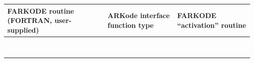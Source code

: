 \documentclass[letterpaper,10pt,english]{sphinxmanual}
\begin{document}
\begin{tabulary}{\linewidth}{|L|L|L|}
\hline
\textbf{\relax 
FARKODE routine
(FORTRAN, user-supplied)
} & \textbf{\relax 
ARKode interface
function type
} & \textbf{\relax 
FARKODE ``activation'' routine
}\\\hline

{\hyperref[f_interface/Usage:f/_/FARKDJAC]{}}
 & 
{\hyperref[c_interface/User_supplied:ARKDlsDenseJacFn]{}}
 & 
{\hyperref[f_interface/Usage:f/_/FARKDENSESETJAC]{}}
\\\hline

{\hyperref[f_interface/Usage:f/_/FARKBJAC]{}}
 & 
{\hyperref[c_interface/User_supplied:ARKDlsBandJacFn]{}}
 & 
{\hyperref[f_interface/Usage:f/_/FARKBANDSETJAC]{}}
\\\hline

{\hyperref[f_interface/Usage:f/_/FARKPSET]{}}
 & 
{\hyperref[c_interface/User_supplied:ARKSpilsPrecSetupFn]{}}
 & 
{\hyperref[f_interface/Usage:f/_/FARKSPILSSETPREC]{}}
\\\hline

{\hyperref[f_interface/Usage:f/_/FARKPSOL]{}}
 & 
{\hyperref[c_interface/User_supplied:ARKSpilsPrecSolveFn]{}}
 & 
{\hyperref[f_interface/Usage:f/_/FARKSPILSSETPREC]{}}
\\\hline

{\hyperref[f_interface/Usage:f/_/FARKJTIMES]{}}
 & 
{\hyperref[c_interface/User_supplied:ARKSpilsJacTimesVecFn]{}}
 & 
{\hyperref[f_interface/Usage:f/_/FARKSPILSSETJAC]{}}
\\\hline

{\hyperref[f_interface/Usage:f/_/FARKEWT]{}}
 & 
{\hyperref[c_interface/User_supplied:ARKEwtFn]{}}
 & 
{\hyperref[f_interface/Usage:f/_/FARKEWTSET]{}}
\\\hline

{\hyperref[f_interface/Usage:f/_/FARKADAPT]{}}
 & 
{\hyperref[c_interface/User_supplied:ARKAdaptFn]{}}
 & 
{\hyperref[f_interface/Usage:f/_/FARKADAPTSET]{}}
\\\hline

{\hyperref[f_interface/Usage:f/_/FARKEXPSTAB]{}}
 & 
{\hyperref[c_interface/User_supplied:ARKExpStabFn]{}}
 & 
{\hyperref[f_interface/Usage:f/_/FARKEXPSTABSET]{}}
\\\hline
\end{tabulary}
\end{document}
